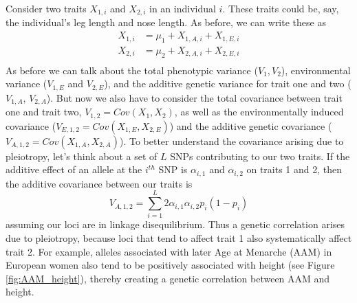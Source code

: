 Consider two traits $X_{1,i}$ and $X_{2,i}$ in an individual $i$. These traits could be,
say, the individual's leg length and nose length. As before, we can write
these as 
\begin{eqnarray}
X_{1,i} &= \mu_1+ X_{1,A,i} + X_{1,E,i}  \nonumber \\
X_{2,i} &= \mu_2 +X_{2,A,i} + X_{2,E,i} \nonumber \\
\end{eqnarray}
As before we can talk about the total phenotypic variance ($V_1,V_2$),
environmental variance  ($V_{1,E}$ and $V_{2,E}$), and the additive genetic variance for trait one and two ($V_{1,A}$, $V_{2,A}$). But now we also have to consider the 
total covariance between trait one and trait two, $V_{1,2}=Cov(X_{1},X_{2})$, as well as the environmentally induced covariance ($V_{E,1,2}=Cov(X_{1,E}
,X_{2,E} )$) and the additive genetic covariance ($V_{A,1,2}
=Cov(X_{1,A} ,X_{2,A} )$). To better understand the covariance arising due to pleiotropy, let's think about a set of $L$ SNPs contributing to our two traits. If the additive effect of an allele at the $i^{th}$ SNP is $\alpha_{i,1}$ and $\alpha_{i,2}$ on traits 1 and 2, then the additive covariance between our traits is
\begin{equation}
V_{A,1,2} = \sum_{i=1}^L 2\alpha_{i,1}\alpha_{i,2} p_i(1-p_i)
\end{equation}
assuming our loci are in linkage disequilibrium. Thus a genetic
correlation arises due to pleiotropy, because loci that tend to affect
trait 1 also systematically affect trait 2. For example, alleles
associated with later Age at Menarche (AAM) in European women also
tend to be positively associated with height (see Figure
\ref{fig:AAM_height}), thereby creating a genetic correlation between
AAM and height. 

